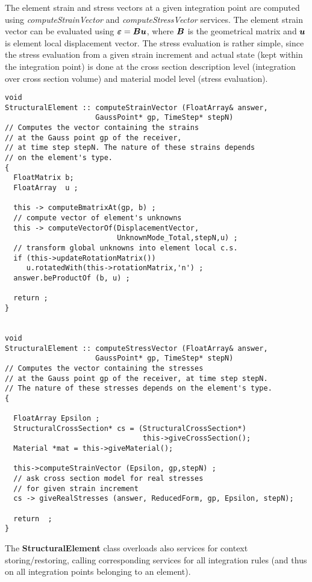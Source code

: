 \documentclass[12pt,draft]{article}
\newcommand{\class}[1]{{\bf #1}}
\newcommand{\service}[1]{{\em #1}}
\newcommand{\mbf}[1]{\mbox{\boldmath$#1$}}
\begin{document}
The element strain and stress vectors at a given integration point are
computed using \service{computeStrainVector} and
\service{computeStressVector} services. The element strain vector can
be evaluated using $\mbf{\varepsilon}=\mbf{B}\mbf{u}$, where $\mbf{B}$
is the geometrical matrix and $\mbf{u}$ is element local displacement
vector. The stress evaluation is rather simple, since the stress
evaluation from a given strain increment and actual state (kept within
the integration point) is done at the cross section description level
(integration over cross section volume) and material model level
(stress evaluation).
\begin{verbatim}
void
StructuralElement :: computeStrainVector (FloatArray& answer, 
                     GaussPoint* gp, TimeStep* stepN)
// Computes the vector containing the strains 
// at the Gauss point gp of the receiver, 
// at time step stepN. The nature of these strains depends
// on the element's type.
{
  FloatMatrix b;
  FloatArray  u ;
  
  this -> computeBmatrixAt(gp, b) ;
  // compute vector of element's unknowns
  this -> computeVectorOf(DisplacementVector,
                          UnknownMode_Total,stepN,u) ;
  // transform global unknowns into element local c.s.
  if (this->updateRotationMatrix()) 
     u.rotatedWith(this->rotationMatrix,'n') ;
  answer.beProductOf (b, u) ;
  
  return ;
}


void
StructuralElement :: computeStressVector (FloatArray& answer, 
                     GaussPoint* gp, TimeStep* stepN)
// Computes the vector containing the stresses 
// at the Gauss point gp of the receiver, at time step stepN. 
// The nature of these stresses depends on the element's type.
{

  FloatArray Epsilon ;
  StructuralCrossSection* cs = (StructuralCrossSection*) 
                                this->giveCrossSection();
  Material *mat = this->giveMaterial();
  
  this->computeStrainVector (Epsilon, gp,stepN) ;
  // ask cross section model for real stresses 
  // for given strain increment 
  cs -> giveRealStresses (answer, ReducedForm, gp, Epsilon, stepN);

  return  ;
}
\end{verbatim}

The \class{StructuralElement} class overloads also services for
context storing/restoring, calling corresponding services for all
integration rules (and thus on all integration points belonging to
an element). 
\end{document}
